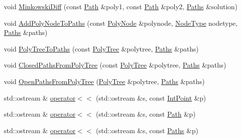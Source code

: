 \begin{DoxyCompactItemize}
\item 
void \mbox{\hyperlink{namespace_clipper_lib_a76dac24102863220c7bc13be222a1dda}{Minkowski\+Diff}} (const \mbox{\hyperlink{namespace_clipper_lib_af39c8fe00f278f18cc8142fef41242da}{Path}} \&poly1, const \mbox{\hyperlink{namespace_clipper_lib_af39c8fe00f278f18cc8142fef41242da}{Path}} \&poly2, \mbox{\hyperlink{namespace_clipper_lib_a4bab1d9e10805fa6f1fd3b78c56efcfe}{Paths}} \&solution)
\item 
void \mbox{\hyperlink{namespace_clipper_lib_a4644758856e780ca359c3e37065397a6}{Add\+Poly\+Node\+To\+Paths}} (const \mbox{\hyperlink{class_clipper_lib_1_1_poly_node}{Poly\+Node}} \&polynode, \mbox{\hyperlink{namespace_clipper_lib_a31e9eef1fdd14cee54118420090b61d3}{Node\+Type}} nodetype, \mbox{\hyperlink{namespace_clipper_lib_a4bab1d9e10805fa6f1fd3b78c56efcfe}{Paths}} \&paths)
\item 
void \mbox{\hyperlink{namespace_clipper_lib_a3713b024b773e4e041f3de4595ff0f77}{Poly\+Tree\+To\+Paths}} (const \mbox{\hyperlink{class_clipper_lib_1_1_poly_tree}{Poly\+Tree}} \&polytree, \mbox{\hyperlink{namespace_clipper_lib_a4bab1d9e10805fa6f1fd3b78c56efcfe}{Paths}} \&paths)
\item 
void \mbox{\hyperlink{namespace_clipper_lib_a83f3a341799f94dd6bd9649b319d85fa}{Closed\+Paths\+From\+Poly\+Tree}} (const \mbox{\hyperlink{class_clipper_lib_1_1_poly_tree}{Poly\+Tree}} \&polytree, \mbox{\hyperlink{namespace_clipper_lib_a4bab1d9e10805fa6f1fd3b78c56efcfe}{Paths}} \&paths)
\item 
void \mbox{\hyperlink{namespace_clipper_lib_aa8b0b36c4c1e8108f39b10e4fba81cc5}{Open\+Paths\+From\+Poly\+Tree}} (\mbox{\hyperlink{class_clipper_lib_1_1_poly_tree}{Poly\+Tree}} \&polytree, \mbox{\hyperlink{namespace_clipper_lib_a4bab1d9e10805fa6f1fd3b78c56efcfe}{Paths}} \&paths)
\item 
std\+::ostream \& \mbox{\hyperlink{namespace_clipper_lib_a2e9613a92f21ac827d5b7f8b5ade5795}{operator$<$$<$}} (std\+::ostream \&s, const \mbox{\hyperlink{struct_clipper_lib_1_1_int_point}{Int\+Point}} \&p)
\item 
std\+::ostream \& \mbox{\hyperlink{namespace_clipper_lib_abd88603a8c170404d069edae2e574fe9}{operator$<$$<$}} (std\+::ostream \&s, const \mbox{\hyperlink{namespace_clipper_lib_af39c8fe00f278f18cc8142fef41242da}{Path}} \&p)
\item 
std\+::ostream \& \mbox{\hyperlink{namespace_clipper_lib_aa8b8872f6e4840cb63769a59a88eab4d}{operator$<$$<$}} (std\+::ostream \&s, const \mbox{\hyperlink{namespace_clipper_lib_a4bab1d9e10805fa6f1fd3b78c56efcfe}{Paths}} \&p)

\end{DoxyCompactItemize}
